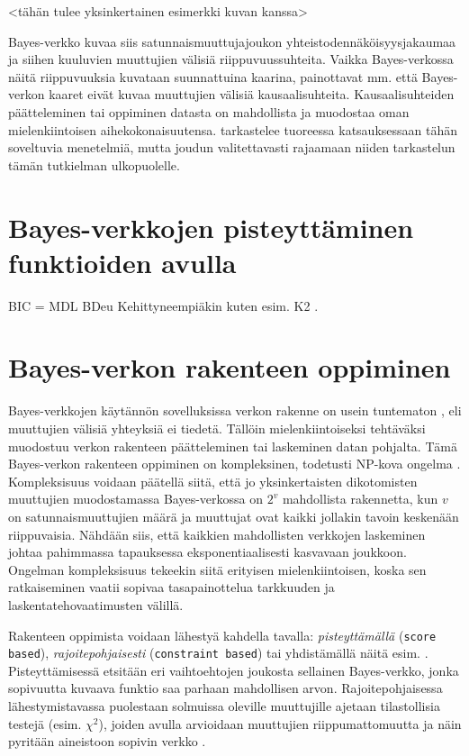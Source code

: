 <tähän tulee yksinkertainen esimerkki kuvan kanssa>

Bayes-verkko kuvaa siis satunnaismuuttujajoukon yhteistodennäköisyysjakaumaa ja siihen kuuluvien muuttujien välisiä riippuvuussuhteita. Vaikka Bayes-verkossa näitä riippuvuuksia kuvataan suunnattuina kaarina, painottavat mm. \citet{ruggeri_bayesian_2008, myllymaki_bayes-verkkojen_1998} että Bayes-verkon kaaret eivät kuvaa muuttujien välisiä kausaalisuhteita. Kausaalisuhteiden päätteleminen tai oppiminen datasta on mahdollista ja muodostaa oman mielenkiintoisen aihekokonaisuutensa. \citet{vowels_dya_2022} tarkastelee tuoreessa katsauksessaan tähän soveltuvia menetelmiä, mutta joudun valitettavasti rajaamaan niiden tarkastelun tämän tutkielman ulkopuolelle.

\section{Bayes-verkkojen pisteyttäminen funktioiden avulla}
BIC = MDL
BDeu
Kehittyneempiäkin kuten esim. K2 \citep{behjati_improved_2020}.

\section{Bayes-verkon rakenteen oppiminen}
Bayes-verkkojen käytännön sovelluksissa verkon rakenne on usein tuntematon \citep{ruggeri_bayesian_2008}, eli muuttujien välisiä yhteyksiä ei tiedetä. Tällöin mielenkiintoiseksi tehtäväksi muodostuu verkon rakenteen päätteleminen tai laskeminen datan pohjalta. Tämä Bayes-verkon rakenteen oppiminen on kompleksinen, todetusti NP-kova ongelma \citep{chickering_large-sample_2004}. Kompleksisuus voidaan päätellä siitä, että jo yksinkertaisten dikotomisten muuttujien muodostamassa Bayes-verkossa on $2^v$ mahdollista rakennetta, kun $v$ on satunnaismuuttujien määrä ja muuttujat ovat kaikki jollakin tavoin keskenään riippuvaisia. Nähdään siis, että kaikkien mahdollisten verkkojen laskeminen johtaa pahimmassa tapauksessa eksponentiaalisesti kasvavaan joukkoon. Ongelman kompleksisuus tekeekin siitä erityisen mielenkiintoisen, koska sen ratkaiseminen vaatii sopivaa tasapainottelua tarkkuuden ja laskentatehovaatimusten välillä.

Rakenteen oppimista voidaan lähestyä kahdella tavalla: \emph{pisteyttämällä} (\texttt{score based}),  \emph{rajoitepohjaisesti} (\texttt{constraint based}) \citep{ramsahai_connecting_2020, scutari_learning_2010} tai yhdistämällä näitä esim. \citep{li_hybrid_2018}. Pisteyttämisessä etsitään eri vaihtoehtojen joukosta sellainen Bayes-verkko, jonka sopivuutta kuvaava funktio saa parhaan mahdollisen arvon. Rajoitepohjaisessa lähestymistavassa puolestaan solmuissa oleville muuttujille ajetaan tilastollisia testejä (esim. $\chi^2$), joiden avulla arvioidaan muuttujien riippumattomuutta ja näin pyritään aineistoon sopivin verkko \citep{ramsahai_connecting_2020, scutari_learning_2010}. 

